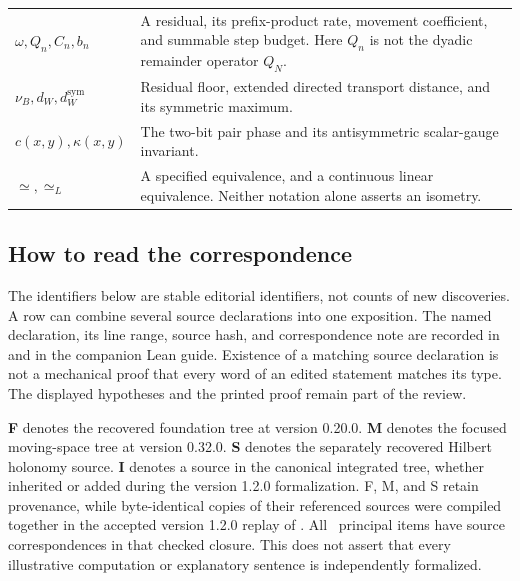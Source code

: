 \begin{longtable}{@{}p{.25\linewidth}p{.7\linewidth}@{}}
\(\omega,Q_n,C_n,b_n\) & A residual, its prefix-product rate, movement coefficient, and summable step budget. Here $Q_n$ is not the dyadic remainder operator $Q_N$.\\
\(\nu_B,d_W,d_W^{\mathrm{sym}}\) & Residual floor, extended directed transport distance, and its symmetric maximum.\\
\(c(x,y),\kappa(x,y)\) & The two-bit pair phase and its antisymmetric scalar-gauge invariant.\\
\(\simeq,\simeq_L\) & A specified equivalence, and a continuous linear equivalence. Neither notation alone asserts an isometry.\\
\bottomrule
\end{longtable}

\subsection{How to read the correspondence}
The identifiers below are stable editorial identifiers, not counts of new discoveries. A row can combine several source declarations into one exposition. The named declaration, its line range, source hash, and correspondence note are recorded in  and in the companion Lean guide. Existence of a matching source declaration is not a mechanical proof that every word of an edited statement matches its type. The displayed hypotheses and the printed proof remain part of the review.

\textbf{F} denotes the recovered foundation tree at version 0.20.0. \textbf{M} denotes the focused moving-space tree at version 0.32.0. \textbf{S} denotes the separately recovered Hilbert holonomy source. \textbf{I} denotes a source in the canonical integrated tree, whether inherited or added during the version 1.2.0 formalization. F, M, and S retain provenance, while byte-identical copies of their referenced sources were compiled together in the accepted version 1.2.0 replay of . All \EditionClaims\ principal items have source correspondences in that checked closure. This does not assert that every illustrative computation or explanatory sentence is independently formalized.



